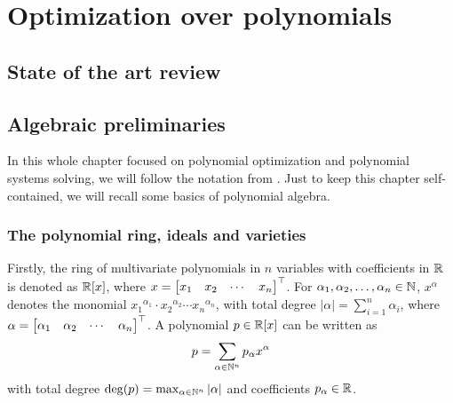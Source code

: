 \chapter{Optimization over polynomials}

\section{State of the art review}

\section{Algebraic preliminaries}
In this whole chapter focused on polynomial optimization and polynomial systems solving, we will follow the notation from \cite{Cox-Little-Shea97}.
Just to keep this chapter self-contained, we will recall some basics of polynomial algebra.

\subsection{The polynomial ring, ideals and varieties}
Firstly, the ring of multivariate polynomials in $n$ variables with coefficients in $\mathbb{R}$ is denoted as $\mathbb{R}[x]$, where $x = \begin{bmatrix} x_1 & x_2 & \cdots & x_n \end{bmatrix}^\top$.
For $\alpha_1, \alpha_2, \ldots, \alpha_n\in\mathbb{N}$, $x^\alpha$ denotes the monomial ${x_1}^{\alpha_1}\cdot{x_2}^{\alpha_2}\cdots{x_n}^{\alpha_n}$, with total degree $|\alpha| = \sum_{i=1}^n \alpha_i$, where $\alpha = \begin{bmatrix} \alpha_1 & \alpha_2 & \cdots & \alpha_n\end{bmatrix}^\top$.
A polynomial $p\in\mathbb{R}[x]$ can be written as
\begin{eqnarray}
  p = \sum_{\alpha\in\mathbb{N}^n} p_\alpha x^\alpha
\end{eqnarray}
with total degree $\deg(p) = \max_{\alpha\in\mathbb{N}^n}|\alpha|$ and coefficients $p_\alpha\in\mathbb{R}$.

